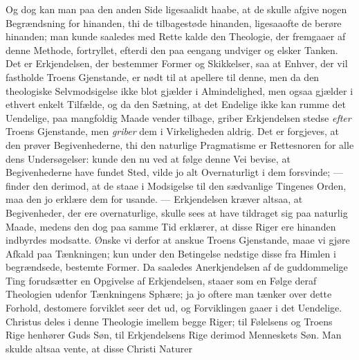 \documentclass[12pt]{book}
\newcommand{\opage}[1]{\marginnote{\footnotesize\textit{[#1]}}}
\begin{document}
Og dog kan man paa den anden Side ligesaalidt haabe, at de skulle afgive nogen
Begrændsning for hinanden, thi de tilbagestøde hinanden, ligesaaofte de berøre
hinanden; man kunde saaledes med Rette kalde den Theologie, der fremgaaer af
denne Methode, fortryllet, efterdi den paa eengang undviger og elsker Tanken.
Det er Erkjendelsen, der bestemmer Former og Skikkelser, saa at Enhver, der vil
fastholde Troens Gjenstande, er nødt til at apellere til denne, men da den
theologiske Selvmodsigelse ikke blot gjælder i Almindelighed, men ogsaa gjælder
i ethvert enkelt Tilfælde, og da den Sætning, at det Endelige ikke kan rumme
det Uendelige, paa mangfoldig Maade vender tilbage, griber Erkjendelsen stedse
\emph{efter} Troens Gjenstande, men \emph{griber} dem i Virkeligheden aldrig.
Det er forgjeves, at den prøver Begivenhederne, thi den naturlige Pragmatisme
er Rettesnoren for alle dens Undersøgelser: kunde den nu ved at følge denne Vei
bevise, at Begivenhederne have fundet Sted, vilde jo alt Overnaturligt i dem
forsvinde; --- finder den derimod, at de staae i Modsigelse til den sædvanlige
Tingenes Orden, maa den jo erklære dem for
\opage{124} usande. --- Erkjendelsen kræver altsaa, at Begivenheder, der ere overnaturlige,
skulle sees at have tildraget sig paa naturlig Maade, medens den dog paa samme
Tid erklærer, at disse Riger ere hinanden indbyrdes modsatte. Ønske vi derfor
at anskue Troens Gjenstande, maae vi gjøre Afkald paa Tænkningen; kun under den
Betingelse nedstige disse fra Himlen i begrændsede, bestemte Former. Da
saaledes Anerkjendelsen af de guddommelige Ting forudsætter en Opgivelse af
Erkjendelsen, staaer som en Følge deraf Theologien udenfor Tænkningens Sphære;
ja jo oftere man tænker over dette Forhold, destomere forviklet seer det ud, og
Forviklingen gaaer i det Uendelige. Christus deles i denne Theologie imellem
begge Riger; til Følelsens og Troens Rige henhører Guds Søn, til Erkjendelsens
Rige derimod Menneskets Søn. Man skulde altsaa vente, at disse Christi Naturer
\end{document}
